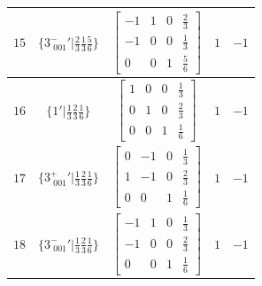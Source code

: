 \documentclass[fleqn,8pt]{jsarticle}
\begin{document}
\begin{longtable}{ccccc}
$ 15 $ & $ \{3^{-}_{\,\,001}{}'|\frac{2}{3} \frac{1}{3} \frac{5}{6}\} $ & $ \begin{bmatrix} -1 & 1 & 0 & \frac{2}{3} \\ -1 & 0 & 0 & \frac{1}{3} \\ 0 & 0 & 1 & \frac{5}{6} \end{bmatrix} $ & $ 1 $ & $ -1 $ \\ \hline
$ 16 $ & $ \{1{}'|\frac{1}{3} \frac{2}{3} \frac{1}{6}\} $ & $ \begin{bmatrix} 1 & 0 & 0 & \frac{1}{3} \\ 0 & 1 & 0 & \frac{2}{3} \\ 0 & 0 & 1 & \frac{1}{6} \end{bmatrix} $ & $ 1 $ & $ -1 $ \\ \hline
$ 17 $ & $ \{3^{+}_{\,\,001}{}'|\frac{1}{3} \frac{2}{3} \frac{1}{6}\} $ & $ \begin{bmatrix} 0 & -1 & 0 & \frac{1}{3} \\ 1 & -1 & 0 & \frac{2}{3} \\ 0 & 0 & 1 & \frac{1}{6} \end{bmatrix} $ & $ 1 $ & $ -1 $ \\ \hline
$ 18 $ & $ \{3^{-}_{\,\,001}{}'|\frac{1}{3} \frac{2}{3} \frac{1}{6}\} $ & $ \begin{bmatrix} -1 & 1 & 0 & \frac{1}{3} \\ -1 & 0 & 0 & \frac{2}{3} \\ 0 & 0 & 1 & \frac{1}{6} \end{bmatrix} $ & $ 1 $ & $ -1 $ \\
\end{longtable}
\end{document}
